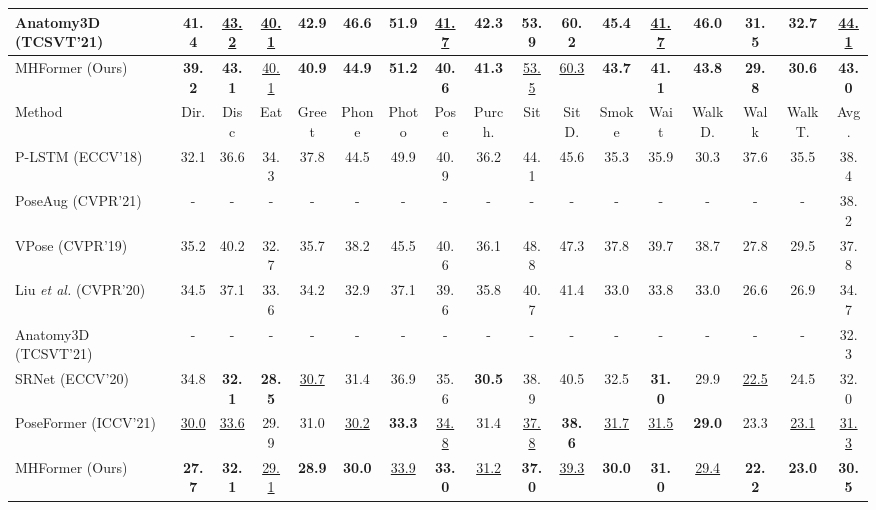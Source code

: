 \documentclass[10pt,twocolumn,letterpaper]{article}
\def\VspaceS{\vspace{-0.30cm}}
\begin{document}
\begin{table*}[htb]
{\begin{tabular}{@{}l|ccccccccccccccc|c@{}}
Anatomy3D (TCSVT'21)~\cite{chen2021anatomy}  &41.4 &\underline{43.2} &\underline{40.1} &42.9 &46.6 &{51.9} &\underline{41.7} &42.3 &53.9 &\textbf{60.2} &45.4 &\underline{41.7} &46.0 &31.5 &32.7 &\underline{44.1} \\
  
  \midrule[0.5pt]

MHFormer (Ours)  &\textbf{39.2} &\textbf{43.1} &\underline{40.1} &\textbf{40.9} &\textbf{44.9} &\textbf{51.2} &\textbf{40.6} &\textbf{41.3} &\underline{53.5} &\underline{60.3} &\textbf{43.7} &\textbf{41.1} &\textbf{43.8} &\textbf{29.8} &\textbf{30.6} &\textbf{43.0} \\

  \toprule[1pt]
  Method & Dir. & Disc & Eat & Greet & Phone & Photo & Pose & Purch. & Sit & SitD. & Smoke & Wait & WalkD. & Walk & WalkT. & Avg.\\
  \midrule[0.5pt]

P-LSTM (ECCV'18)~\cite{lee2018propagating}  &32.1 &36.6 &34.3 &37.8 &44.5 &49.9 &40.9 &36.2 &44.1 &45.6 &35.3 &35.9 &30.3 &37.6 &35.5 &38.4 \\

PoseAug (CVPR'21)~\cite{gong2021poseaug}  &- &- &- &- &- &- &- &- &- &- &- &- &- &- &-  &38.2 \\

VPose (CVPR'19)~\cite{pavllo20193d}  &35.2 &40.2 &32.7 &35.7 &38.2 &45.5 &40.6 &36.1 &48.8 &47.3 &37.8 &39.7 &38.7 &27.8 & 29.5 &37.8 \\

Liu \emph{et al.} (CVPR'20)~\cite{liu2020attention}  &34.5 &37.1 &33.6 &34.2 &32.9 &37.1 &39.6 &35.8 &40.7 &41.4 &33.0 &33.8 &33.0 &26.6 &26.9 &34.7 \\

Anatomy3D (TCSVT'21)~\cite{chen2021anatomy}  &- &- &- &- &- &- &- &- &- &- &- &- &- &- &- &32.3 \\
    
SRNet (ECCV'20)~\cite{zeng2020srnet}  &34.8 &\textbf{32.1} &\textbf{28.5} &\underline{30.7} &{31.4} &{36.9} &35.6 &\textbf{30.5} &{38.9} &40.5 &32.5 &\textbf{31.0} &29.9 &\underline{22.5} &24.5 &32.0 \\

PoseFormer (ICCV'21)~\cite{poseformer}  &\underline{30.0} &\underline{33.6} &{29.9} &31.0 &\underline{30.2} &\textbf{33.3} &\underline{34.8} &31.4 &\underline{37.8} &\textbf{38.6} &\underline{31.7} &\underline{31.5} &\textbf{29.0} &23.3 &\underline{23.1} &\underline{31.3} \\

  \midrule[0.5pt]
  
MHFormer (Ours)  &\textbf{27.7} &\textbf{32.1} &\underline{29.1} &\textbf{28.9} &\textbf{30.0} &\underline{33.9} &\textbf{33.0} &\underline{31.2} &\textbf{37.0} &\underline{39.3} &\textbf{30.0} &\textbf{31.0} &\underline{29.4} &\textbf{22.2} &\textbf{23.0} &\textbf{30.5}

 \\
  \toprule[1pt]
  \end{tabular}
  }
  \VspaceS
  \label{table:h36m}
\end{table*}
\end{document}
